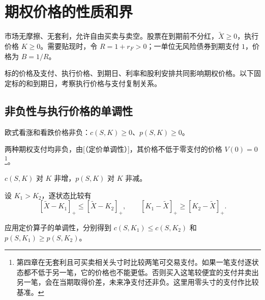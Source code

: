 \section{期权价格的性质和界}\label{sec:wj-five-bounds}
\begin{tcolorbox}[knowledge,title=本节条件]
市场无摩擦、无套利，允许自由买卖与卖空。股票在到期前不分红，$\tilde X\ge0$，执行价格 $K\ge0$。需要贴现时，令 $R=1+r_F>0$；一单位无风险债券到期支付 $1$，价格为 $B=1/R$。
\end{tcolorbox}
标的价格及支付、执行价格、到期日、利率和股利安排共同影响期权价格。以下固定标的和到期日，考察执行价格与支付复制关系。

\subsection{非负性与执行价格的单调性}
\begin{tcolorbox}[knowledge]
欧式看涨和看跌价格非负：$c(S,K)\ge0$、$p(S,K)\ge0$。
\end{tcolorbox}
\begin{solution}[label-content={证明},blank-type=none]
两种期权支付均非负，由[（定价单调性）]，其价格不低于零支付的价格 $V(0)=0$\footnote{第四章在无套利且可买卖相关头寸时比较两笔可交易支付。如果一笔支付逐状态都不低于另一笔，它的价格也不能更低。否则买入这笔较便宜的支付并卖出另一笔，会在当期取得价差，未来净支付还非负。这里用零头寸的支付作比较基准。}。
\end{solution}

\begin{tcolorbox}[knowledge]
$c(S,K)$ 对 $K$ 非增，$p(S,K)$ 对 $K$ 非减。
\end{tcolorbox}
\begin{solution}[label-content={证明},blank-type=none]
设 $K_1>K_2$，逐状态比较有
\[
 [\tilde X-K_1]_+\le[\tilde X-K_2]_+,
 \qquad [K_1-\tilde X]_+\ge[K_2-\tilde X]_+.
\]

应用定价算子的单调性，分别得到 $c(S,K_1)\le c(S,K_2)$ 和 $p(S,K_1)\ge p(S,K_2)$。
\end{solution}

